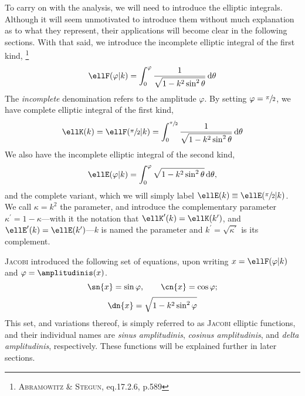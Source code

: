 To carry on with the analysis, we will need to introduce the elliptic integrals.
Although it will seem unmotivated to introduce them without much explanation as to what they represent, their applications will become clear in the following sections.
With that said, we introduce the incomplete elliptic integral of the first kind,%
\footnote{\cite{abramowitz1965handbook} \textsc{Abramowitz} \& \textsc{Stegun}, eq.17.2.6, p.589}
\begin{equation}\label{eq:incomplete_elliptic_integral_first}
  \ellF(\varphi \vert k) = \int_{0}^{\varphi} \frac{1}{\sqrt{1 - k^2 \sin^2{\theta}}}\,\dee\theta
\end{equation}
The \emph{incomplete} denomination refers to the amplitude $\varphi$.
By setting $\varphi = \sfrac{\pi}{2}$, we have complete elliptic integral of the first kind,
\begin{equation}\label{eq:complete_elliptic_integral_first}
  \ellK(k) = \ellF(\sfrac{\pi}{2} \vert k) = \int_{0}^{\sfrac{\pi}{2}} \frac{1}{\sqrt{1 - k^2 \sin^2{\theta}}} \,\dee\theta
\end{equation}
We also have the incomplete elliptic integral of the second kind,
\begin{equation}\label{eq:incomplete_elliptic_integral_second}
  \ellE(\varphi \vert k) = \int_{0}^{\varphi} \sqrt{1 - k^2 \sin^2{\theta}}\,\dee\theta,
\end{equation}
and the complete variant, which we will simply label $\ellE(k) \equiv \ellE(\sfrac{\pi}{2} \vert k)$.
We call $\kappa = k^2$ the parameter, and introduce the complementary parameter ${\kappa}^{\prime} = 1 - \kappa$---with it the notation that $\ellK^{\prime}(k) = \ellK(k^{\prime})$, and $\ellE^{\prime}(k) = \ellE(k^{\prime})$---$k$ is named the parameter and $k^{\prime} = \sqrt{\kappa^{\prime}}$ is its complement.

\textsc{Jacobi} introduced the following set of equations, upon writing $x = \ellF(\varphi \vert k)$ and $\varphi = \amplitudinis(x)$.
\begin{equation}\label{eq:jacobi_sn_cn}
  \sn{x} = \sin{\varphi}, \qquad \cn{x} = \cos{\varphi};
\end{equation}
\begin{equation}\label{eq:jacobi_dn}
  \dn{x} = \sqrt{1 - k^2\sin^2{\varphi}}
\end{equation}
This set, and variations thereof, is simply referred to as \textsc{Jacobi} elliptic functions, and their individual names are \emph{sinus amplitudinis}, \emph{cosinus amplitudinis}, and \emph{delta amplitudinis}, respectively.
These functions will be explained further in later sections.
